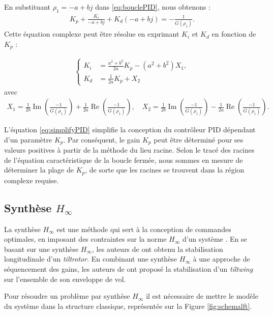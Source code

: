 {En substituant  $\rho_{1} = -a + bj$ dans \eqref{eq:bouclePID}, nous obtenons : 
\begin{align}
    K_{p} +  \frac{K_{i}}{-a + bj} + K_{d} (-a + bj) = -\frac{1}{G(\rho_{1})}.
\end{align}
Cette équation complexe peut être résolue en exprimant $K_{i}$ et $K_{d}$ en fonction de $K_{p}$ :

\begin{align}
    \label{eq:simplifyPID}
    \left\{
        \begin{aligned}
            K_{i} &= \frac{a^{2} + b^{2}}{2a} K_{p} - (a^{2} + b^{2}) X_{1},\\
            K_{d} &= \frac{1}{2a} K_{p} + X_{2}
        \end{aligned}
      \right.
  \end{align}
  avec 
  \begin{align*}
    X_{1} = \frac{1}{2b} \operatorname{Im}(\frac{-1}{G(\rho_{1})})+ \frac{1}{2a} \operatorname{Re}(\frac{-1}{G(\rho_{1})}), \quad X_{2} = \frac{1}{2b} \operatorname{Im}(\frac{-1}{G(\rho_{1})})- \frac{1}{2a} \operatorname{Re}(\frac{-1}{G(\rho_{1})}).
  \end{align*}

  L'équation \eqref{eq:simplifyPID} simplifie la conception du contrôleur PID dépendant d'un paramètre $K_{p}$. Par conséquent, le gain $K_{p}$ peut être déterminé pour ses valeurs positives à partir de la méthode du lieu racine. Selon le tracé des racines de l'équation caractéristique de la boucle fermée, nous sommes en mesure de déterminer la plage de $K_{p}$, de sorte que les racines se trouvent dans la région complexe requise. 

}
\subsection*{Synthèse $H_{\infty}$}
La synthèse $H_{\infty}$ est une méthode qui sert à la conception de commandes optimales, en imposant des contraintes sur la norme $H_{\infty}$ d'un système \cite{1576856, ApkarianMulti}. En se basant sur une synthèse $H_{\infty}$, les auteurs de \cite{SunYang2009} ont obtenu la stabilisation longitudinale d'un \textit{tiltrotor}. En combinant une synthèse $H_{\infty}$ à une approche de séquencement des gains, les auteurs de \cite{DickesonMix2005, DickesonCifdaloz2006,DickesonMiles2007} ont proposé la stabilisation d'un \textit{tiltwing} sur l'ensemble de son enveloppe de vol.

Pour résoudre un problème par synthèse $H_{\infty}$ il est nécessaire de mettre le modèle du système dans la structure classique, représentée sur la Figure \ref{fig:schemalft}. 

